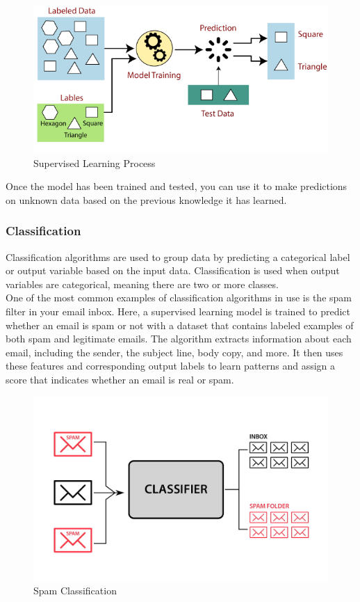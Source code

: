 \begin{figure}[h!]
    \centering
    \includegraphics[width=0.75\linewidth]{figures/theory/supervised-learning.png}
    \caption{Supervised Learning Process}
    \label{fig:supervised-learning}
\end{figure}

Once the model has been trained and tested, you can use it to make predictions on unknown data based on the previous knowledge it has learned. \cite{google:supervised-learning}

\subsubsection*{Classification}

Classification algorithms are used to group data by predicting a categorical label or output variable based on the input data. Classification is used when output variables are categorical, meaning there are two or more classes. \cite{google:supervised-learning} \\

One of the most common examples of classification algorithms in use is the spam filter in your email inbox. Here, a supervised learning model is trained to predict whether an email is spam or not with a dataset that contains labeled examples of both spam and legitimate emails. The algorithm extracts information about each email, including the sender, the subject line, body copy, and more. It then uses these features and corresponding output labels to learn patterns and assign a score that indicates whether an email is real or spam. \cite{google:supervised-learning}

\begin{figure}[h!]
    \centering
    \includegraphics[width=0.75\linewidth]{figures/theory/classification.jpg}
    \caption{Spam Classification}
    \label{fig:classification}
\end{figure}

